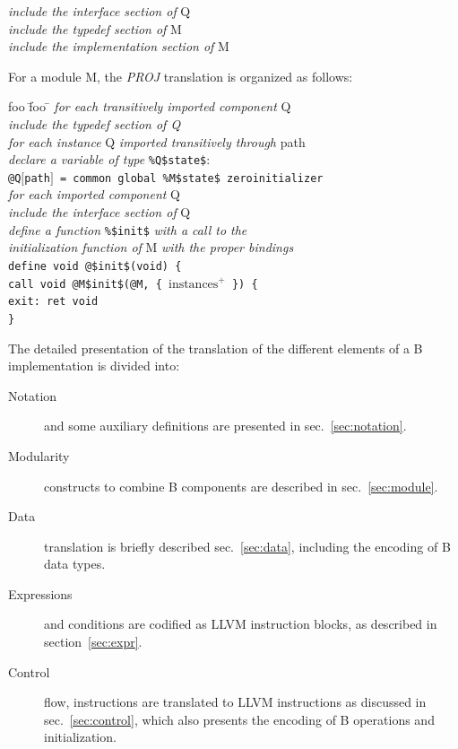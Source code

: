 \documentclass{llncs}
\newcommand{\llvm}[1]{\texttt{#1}}
\newcommand{\B}[1]{\textsf{#1}}
\newcommand{\ListOf}[1]{$\mbox{#1}^+$}
\begin{document}
\begin{enumerate}
\begin{center}
\begin{tabbing}
    \> \textit{include the interface section of }\B{Q} \\
    \textit{include the typedef section of} \B{M} \\
    \textit{include the implementation section of} \B{M}
  \end{tabbing}
\end{center}
For a module \B{M}, the \emph{PROJ\/} translation is organized as follows:
\begin{center}
  \begin{tabbing}
    foo \= foo \= \kill
    \textit{for each transitively imported component} \B{Q} \\
    \> \textit{include the typedef section of \B{Q}} \\
    \textit{for each instance} \B{Q} \textit{imported transitively through} \B{path} \\
    \> \textit{declare a variable of type} \llvm{\%Q\$state\$}: \\
    \> \llvm{@Q$\lbrack$path$\rbrack$ = common global \%M\$state\$ zeroinitializer} \\

    \textit{for each imported component} \B{Q} \\
    \> \textit{include the interface section of} \B{Q} \\
    \textit{define a function} \llvm{\%\$init\$} \textit{with a call to the } \\
    \> \textit{initialization function of} \B{M} \textit{with the proper bindings} \\
    \> \llvm{define void @\$init\$(void) \{} \\
    \> \> \llvm{call void @M\$init\$(@M, \{ \ListOf{instances} \}) \{} \\
    \> \> \llvm{exit: ret void} \\
    \> \llvm{\}} \\
    \> 
  \end{tabbing}
\end{center}

The detailed presentation of the translation of the different elements of a B
implementation is divided into:
\begin{description}
\item[Notation] and some auxiliary definitions are presented in sec.~\ref{sec:notation}.
\item[Modularity] constructs to combine B components are described in
  sec.~\ref{sec:module}.
\item[Data] translation is briefly described sec.~\ref{sec:data}, including
  the encoding of B data types.
\item[Expressions] and conditions are codified as LLVM instruction blocks, as
  described in section~\ref{sec:expr}.
\item[Control] flow, instructions are translated to LLVM instructions as
  discussed in sec.~\ref{sec:control}, which also presents the encoding
  of B operations and initialization.
\end{description}


\end{enumerate}
\end{document}
